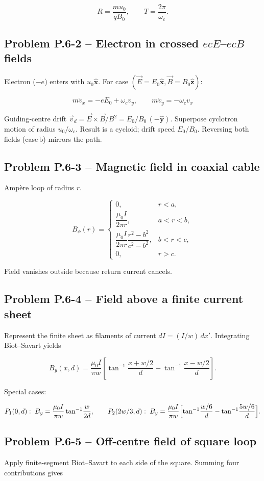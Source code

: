 \documentclass[12pt]{article}
\begin{document}
\[
\boxed{R=\dfrac{m u_0}{qB_0}},\qquad
\boxed{T=\dfrac{2\pi}{\omega_c}}.
\]
\n\bigskip\n\subsection*{Problem P.6-2 – Electron in crossed \( ec E\)–\( ec B\) fields}\n
Electron (\(-e\)) enters with \(u_0\hat{\mathbf x}\).  For case \((\vec E=E_0\hat{\mathbf x},\vec B=B_0\hat{\mathbf z})\):

\[
m\dot v_x=-eE_0+\omega_c v_y,\qquad
m\dot v_y=-\omega_c v_x
\]

Guiding‑centre drift \(\vec v_d=\vec E\times\vec B/B^{2}=E_0/B_0\,(-\hat{\mathbf y})\).
Superpose cyclotron motion of radius \(u_0/\omega_c\). Result is a cycloid; drift speed \(E_0/B_0\).  Reversing both fields (case b) mirrors the path.
\n\bigskip\n\subsection*{Problem P.6-3 – Magnetic field in coaxial cable}\n
Ampère loop of radius \(r\).

\[
B_\phi(r)=
\begin{cases}
0,&r<a,\\[6pt]
\dfrac{\mu_0 I}{2\pi r},&a<r<b,\\[6pt]
\dfrac{\mu_0 I}{2\pi r}\dfrac{r^{2}-b^{2}}{c^{2}-b^{2}},&b<r<c,\\[8pt]
0,&r>c.
\end{cases}
\]

Field vanishes outside because return current cancels.
\n\bigskip\n\subsection*{Problem P.6-4 – Field above a finite current sheet}\n
Represent the finite sheet as filaments of current \(dI=(I/w)\,dx'\). Integrating Biot–Savart yields

\[
B_y(x,d)=\frac{\mu_0 I}{\pi w}\left[\tan^{-1}\frac{x+w/2}{d}-\tan^{-1}\frac{x-w/2}{d}\right].
\]

Special cases:

\[
P_1(0,d):\;B_y=\frac{\mu_0 I}{\pi w}\tan^{-1}\!\frac{w}{2d},\qquad
P_2(2w/3,d):\;B_y=\frac{\mu_0 I}{\pi w}\Bigl[\tan^{-1}\!\frac{w/6}{d}-\tan^{-1}\!\frac{5w/6}{d}\Bigr].
\]
\n\bigskip\n\subsection*{Problem P.6-5 – Off‑centre field of square loop}\n
Apply finite‑segment Biot–Savart to each side of the square.  Summing four contributions gives
\end{document}
